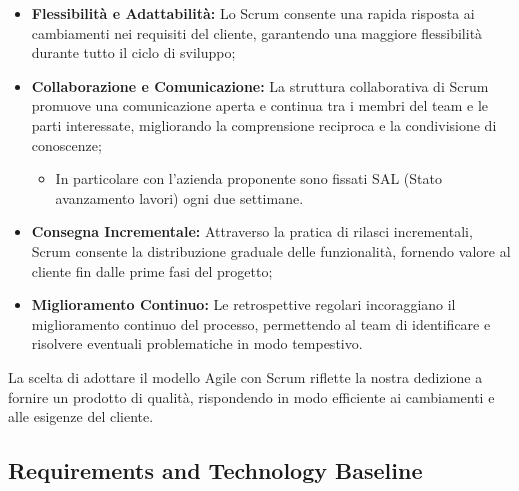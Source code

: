 \documentclass{article}
\begin{document}
\begin{itemize}
    \item \textbf{Flessibilità e Adattabilità:} Lo Scrum consente una rapida risposta ai cambiamenti nei requisiti del cliente, garantendo una maggiore flessibilità durante tutto il ciclo di sviluppo;
    \item \textbf{Collaborazione e Comunicazione:} La struttura collaborativa di Scrum promuove una comunicazione aperta e continua tra i membri del team e le parti interessate, migliorando la comprensione reciproca e la condivisione di conoscenze;
    \begin{itemize}
        \item In particolare con l'azienda proponente sono fissati SAL (Stato avanzamento lavori) ogni due settimane.
    \end{itemize}
    \item \textbf{Consegna Incrementale:} Attraverso la pratica di rilasci incrementali, Scrum consente la distribuzione graduale delle funzionalità, fornendo valore al cliente fin dalle prime fasi del progetto;
    \item \textbf{Miglioramento Continuo:} Le retrospettive regolari incoraggiano il miglioramento continuo del processo, permettendo al team di identificare e risolvere eventuali problematiche in modo tempestivo.
\end{itemize}

La scelta di adottare il modello Agile con Scrum riflette la nostra dedizione a fornire un prodotto di qualità, rispondendo in modo efficiente ai cambiamenti e alle esigenze del cliente.


\subsection{Requirements and Technology Baseline}
\end{document}
